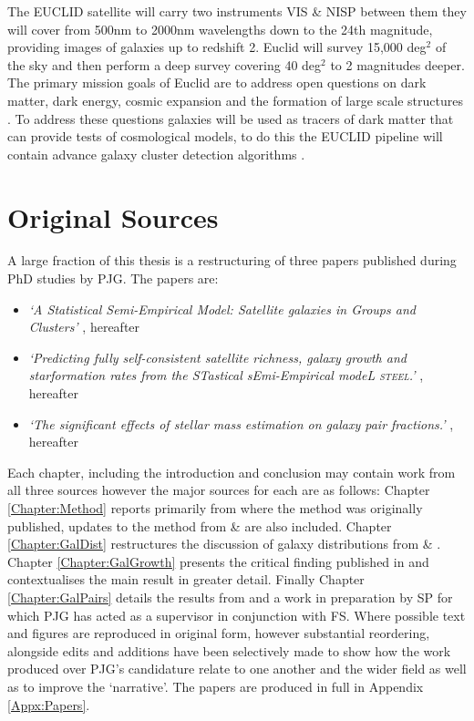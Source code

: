 The EUCLID satellite will carry two instruments VIS \& NISP between them they will cover from 500nm to 2000nm wavelengths down to the 24th magnitude, providing images of galaxies up to redshift 2. Euclid will survey 15,000 deg$^2$ of the sky and then perform a deep survey covering 40 deg$^2$ to 2 magnitudes deeper. The primary mission goals of Euclid are to address open questions on dark matter, dark energy, cosmic expansion and the formation of large scale structures \cite{Amendola2018CosmologySatellite}. To address these questions galaxies will be used as tracers of dark matter that can provide tests of cosmological models, to do this the EUCLID pipeline will contain advance galaxy cluster detection algorithms \cite{Adam2019EuclidSelection}.


\section{Original Sources}

A large fraction of this thesis is a restructuring of three papers published during PhD studies by PJG. The papers are:
\begin{itemize}
    \item \textit{`A Statistical Semi-Empirical Model: Satellite galaxies in Groups and Clusters'}  \citet{Grylls2019AClusters}, hereafter 
    \item \textit{`Predicting fully self-consistent satellite richness, galaxy growth and starformation rates from the STastical sEmi-Empirical modeL \textsc{steel}.'} \citet{Grylls2020PredictingSTEEL}, hereafter 
    \item \textit{`The significant effects of stellar mass estimation on galaxy pair fractions.'} \citet{Grylls2020TheFractions}, hereafter 
\end{itemize}

Each chapter, including the introduction and conclusion may contain work from all three sources however the major sources for each are as follows: Chapter \ref{Chapter:Method} reports primarily from  where the method was originally published, updates to the method from  \&  are also included. Chapter \ref{Chapter:GalDist} restructures the discussion of galaxy distributions from  \& . Chapter \ref{Chapter:GalGrowth} presents the critical finding published in  and contextualises the main result in greater detail. Finally Chapter \ref{Chapter:GalPairs} details the results from  and a work in preparation by SP for which PJG has acted as a supervisor in conjunction with FS. Where possible text and figures are reproduced in original form, however substantial reordering, alongside edits and additions have been selectively made to show how the work produced over PJG's candidature relate to one another and the wider field as well as to improve the `narrative'. The papers are produced in full in Appendix \ref{Appx:Papers}.

